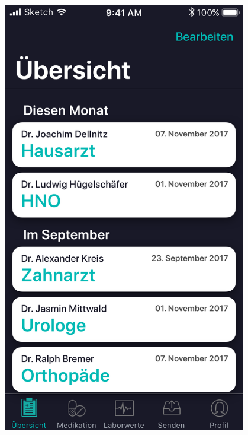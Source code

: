 \documentclass[a4paper]{scrreprt}
\begin{document}
\begin{minipage}[t][][b]{0.45\textwidth}
\vspace{0pt}
\includegraphics[width=0.8\textwidth]{mockups/OverviewTab}
\begin{flushleft}
\end{flushleft}



\end{minipage}
\end{document}
